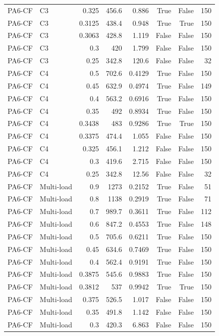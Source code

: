 \begin{table}[htbp]
\begin{tabular}{llrrrrrr}
PA6-CF & C3 & 0.325 & 456.6 & 0.886 & True & False & 150 \\
PA6-CF & C3 & 0.3125 & 438.4 & 0.948 & True & True & 150 \\
PA6-CF & C3 & 0.3063 & 428.8 & 1.119 & False & False & 150 \\
PA6-CF & C3 & 0.3 & 420 & 1.799 & False & False & 150 \\
PA6-CF & C3 & 0.25 & 342.8 & 120.6 & False & False & 32 \\
PA6-CF & C4 & 0.5 & 702.6 & 0.4129 & True & False & 150 \\
PA6-CF & C4 & 0.45 & 632.9 & 0.4974 & True & False & 149 \\
PA6-CF & C4 & 0.4 & 563.2 & 0.6916 & True & False & 150 \\
PA6-CF & C4 & 0.35 & 492 & 0.8934 & True & False & 150 \\
PA6-CF & C4 & 0.3438 & 483 & 0.9286 & True & True & 150 \\
PA6-CF & C4 & 0.3375 & 474.4 & 1.055 & False & False & 150 \\
PA6-CF & C4 & 0.325 & 456.1 & 1.212 & False & False & 150 \\
PA6-CF & C4 & 0.3 & 419.6 & 2.715 & False & False & 150 \\
PA6-CF & C4 & 0.25 & 342.8 & 12.56 & False & False & 32 \\
PA6-CF & Multi-load & 0.9 & 1273 & 0.2152 & True & False & 51 \\
PA6-CF & Multi-load & 0.8 & 1138 & 0.2919 & True & False & 71 \\
PA6-CF & Multi-load & 0.7 & 989.7 & 0.3611 & True & False & 112 \\
PA6-CF & Multi-load & 0.6 & 847.2 & 0.4553 & True & False & 148 \\
PA6-CF & Multi-load & 0.5 & 705.6 & 0.6211 & True & False & 150 \\
PA6-CF & Multi-load & 0.45 & 634.6 & 0.7469 & True & False & 150 \\
PA6-CF & Multi-load & 0.4 & 562.4 & 0.9191 & True & False & 150 \\
PA6-CF & Multi-load & 0.3875 & 545.6 & 0.9883 & True & False & 150 \\
PA6-CF & Multi-load & 0.3812 & 537 & 0.9942 & True & True & 150 \\
PA6-CF & Multi-load & 0.375 & 526.5 & 1.017 & False & False & 150 \\
PA6-CF & Multi-load & 0.35 & 491.8 & 1.142 & False & False & 150 \\
PA6-CF & Multi-load & 0.3 & 420.3 & 6.863 & False & False & 150 \\
\bottomrule
\end{tabular}
\end{table}
